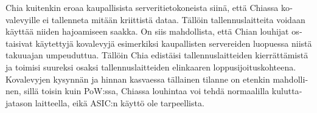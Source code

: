\begin{otherlanguage}{english}
Chia kuitenkin eroaa kaupallisista serveritietokoneista siinä, että Chiassa kovalevyille ei tallenneta mitään kriittistä dataa. Tällöin tallennuslaitteita voidaan käyttää niiden hajoamiseen saakka. On siis mahdollista, että Chian louhijat ostaisivat käytettyjä kovalevyjä esimerkiksi kaupallisten servereiden luopuessa niistä takuuajan umpeuduttua. Tällöin Chia edistäisi tallennuslaitteiden kierrättämistä ja toimisi suureksi osaksi tallennuslaitteiden elinkaaren loppusijoituskohteena. Kovalevyjen kysynnän ja hinnan kasvaessa tällainen tilanne on etenkin mahdollinen, sillä toisin kuin PoW:ssa, Chiassa louhintaa voi tehdä normaalilla kuluttajatason laitteella, eikä ASIC:n käyttö ole tarpeellista.

\end{otherlanguage}